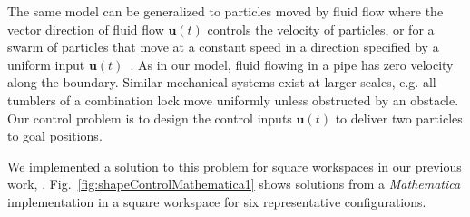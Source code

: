  
  The same model can be generalized to particles moved by fluid flow where the vector direction of fluid flow $\mathbf{u}(t)$ controls the velocity of particles, or for a swarm of particles that move at a constant speed in a direction specified by a uniform input $\mathbf{u}(t)$~\cite{Rubenstein2012}.
  As in our model, fluid flowing in a pipe has zero velocity along the boundary. Similar mechanical systems exist at larger scales, e.g. all tumblers of a combination lock move uniformly unless obstructed by an obstacle.
 Our control problem is to design the control inputs $\mathbf{u}(t)$ to deliver two particles to goal positions.
 
 
 
We implemented a solution to this problem for  square workspaces in our previous work, \cite{shahrokhi2017algorithms}.
 Fig.~\ref{fig:shapeControlMathematica1} shows solutions from a \emph{Mathematica} implementation in a square workspace for six representative configurations.
